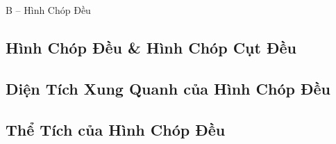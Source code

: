 \documentclass{article}
\numberwithin{equation}{section}
\begin{document}

\begin{center}
	\Large B -- Hình Chóp Đều
\end{center}

\subsection{Hình Chóp Đều \& Hình Chóp Cụt Đều}


\subsection{Diện Tích Xung Quanh của Hình Chóp Đều}


\subsection{Thể Tích của Hình Chóp Đều}


\printbibliography[heading=bibintoc]
	
\end{document}
